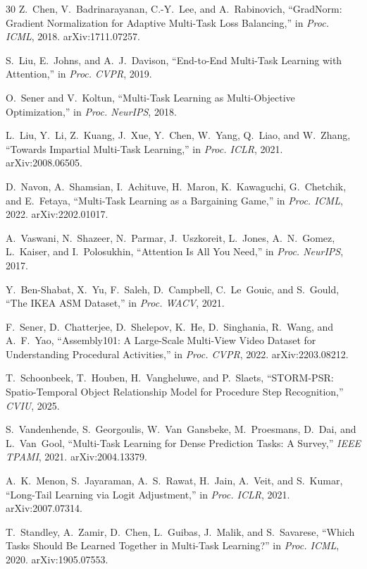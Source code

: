 \documentclass[conference]{IEEEtran}
\begin{document}
\begin{thebibliography}{30}
Z.~Chen, V.~Badrinarayanan, C.-Y.~Lee, and A.~Rabinovich,
``GradNorm: Gradient Normalization for Adaptive Multi-Task Loss Balancing,''
in \emph{Proc. ICML}, 2018.
arXiv:1711.07257.

S.~Liu, E.~Johns, and A.~J.~Davison,
``End-to-End Multi-Task Learning with Attention,''
in \emph{Proc. CVPR}, 2019.

O.~Sener and V.~Koltun,
``Multi-Task Learning as Multi-Objective Optimization,''
in \emph{Proc. NeurIPS}, 2018.

L.~Liu, Y.~Li, Z.~Kuang, J.~Xue, Y.~Chen, W.~Yang, Q.~Liao, and W.~Zhang,
``Towards Impartial Multi-Task Learning,''
in \emph{Proc. ICLR}, 2021.
arXiv:2008.06505.

D.~Navon, A.~Shamsian, I.~Achituve, H.~Maron, K.~Kawaguchi, G.~Chetchik, and E.~Fetaya,
``Multi-Task Learning as a Bargaining Game,''
in \emph{Proc. ICML}, 2022.
arXiv:2202.01017.

A.~Vaswani, N.~Shazeer, N.~Parmar, J.~Uszkoreit, L.~Jones, A.~N.~Gomez, L.~Kaiser, and I.~Polosukhin,
``Attention Is All You Need,''
in \emph{Proc. NeurIPS}, 2017.

Y.~Ben-Shabat, X.~Yu, F.~Saleh, D.~Campbell, C.~Le~Gouic, and S.~Gould,
``The IKEA ASM Dataset,''
in \emph{Proc. WACV}, 2021.

F.~Sener, D.~Chatterjee, D.~Shelepov, K.~He, D.~Singhania, R.~Wang, and A.~F.~Yao,
``Assembly101: A Large-Scale Multi-View Video Dataset for Understanding Procedural Activities,''
in \emph{Proc. CVPR}, 2022.
arXiv:2203.08212.

T.~Schoonbeek, T.~Houben, H.~Vangheluwe, and P.~Slaets,
``STORM-PSR: Spatio-Temporal Object Relationship Model for Procedure Step Recognition,''
\emph{CVIU}, 2025.

S.~Vandenhende, S.~Georgoulis, W.~Van~Gansbeke, M.~Proesmans, D.~Dai, and L.~Van~Gool,
``Multi-Task Learning for Dense Prediction Tasks: A Survey,''
\emph{IEEE TPAMI}, 2021.
arXiv:2004.13379.

A.~K.~Menon, S.~Jayaraman, A.~S.~Rawat, H.~Jain, A.~Veit, and S.~Kumar,
``Long-Tail Learning via Logit Adjustment,''
in \emph{Proc. ICLR}, 2021.
arXiv:2007.07314.

T.~Standley, A.~Zamir, D.~Chen, L.~Guibas, J.~Malik, and S.~Savarese,
``Which Tasks Should Be Learned Together in Multi-Task Learning?''
in \emph{Proc. ICML}, 2020.
arXiv:1905.07553.


\end{thebibliography}
\end{document}
